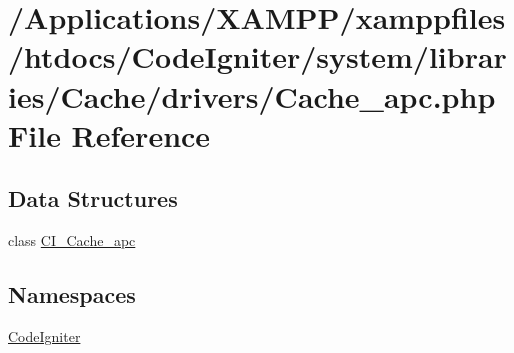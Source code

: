 \hypertarget{_cache__apc_8php}{}\section{/\+Applications/\+X\+A\+M\+P\+P/xamppfiles/htdocs/\+Code\+Igniter/system/libraries/\+Cache/drivers/\+Cache\+\_\+apc.php File Reference}
\label{_cache__apc_8php}
\subsection*{Data Structures}
\begin{DoxyCompactItemize}
\item 
class \mbox{\hyperlink{class_c_i___cache__apc}{C\+I\+\_\+\+Cache\+\_\+apc}}
\end{DoxyCompactItemize}
\subsection*{Namespaces}
\begin{DoxyCompactItemize}
\item 
 \mbox{\hyperlink{namespace_code_igniter}{Code\+Igniter}}
\end{DoxyCompactItemize}
